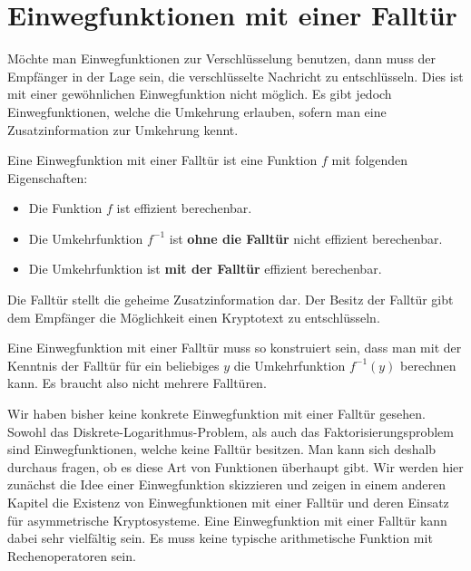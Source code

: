 \section{Einwegfunktionen mit einer Falltür}

Möchte man Einwegfunktionen zur Verschlüsselung benutzen, dann muss der Empfänger in der Lage sein, die verschlüsselte Nachricht zu entschlüsseln. Dies ist mit einer gewöhnlichen Einwegfunktion nicht möglich. Es gibt jedoch Einwegfunktionen, welche die Umkehrung erlauben, sofern man eine Zusatzinformation zur Umkehrung kennt.

\begin{definition}
	Eine Einwegfunktion mit einer Falltür ist eine Funktion $f$ mit folgenden Eigenschaften:
	\begin{itemize}
		\item Die Funktion $f$ ist effizient berechenbar.
		\item Die Umkehrfunktion $f^{-1}$ ist \textbf{ohne die Falltür} nicht effizient berechenbar.
		\item Die Umkehrfunktion ist \textbf{mit der Falltür} effizient berechenbar.
	\end{itemize}
\end{definition}

Die Falltür stellt die geheime Zusatzinformation dar. Der Besitz der Falltür gibt dem Empfänger die Möglichkeit einen Kryptotext zu entschlüsseln.

\begin{important}
	Eine Einwegfunktion mit einer Falltür muss so konstruiert sein, dass man mit der Kenntnis der Falltür für ein beliebiges $y$ die Umkehrfunktion $f^{-1}(y)$ berechnen kann. Es braucht also nicht mehrere Falltüren.
\end{important}

Wir haben bisher keine konkrete Einwegfunktion mit einer Falltür gesehen. Sowohl das Diskrete-Logarithmus-Problem, als auch das Faktorisierungsproblem sind Einwegfunktionen, welche keine Falltür besitzen. Man kann sich deshalb durchaus fragen, ob es diese Art von Funktionen überhaupt gibt. Wir werden hier zunächst die Idee einer Einwegfunktion skizzieren und zeigen in einem anderen Kapitel die Existenz von Einwegfunktionen mit einer Falltür und deren Einsatz für asymmetrische Kryptosysteme. Eine Einwegfunktion mit einer Falltür kann dabei sehr vielfältig sein. Es muss keine typische arithmetische Funktion mit Rechenoperatoren sein.

